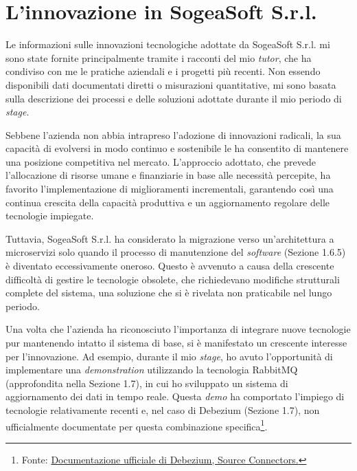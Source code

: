     
    \section{L’innovazione in SogeaSoft S.r.l.}

    Le informazioni sulle innovazioni tecnologiche adottate da SogeaSoft S.r.l. mi sono state fornite principalmente tramite i racconti del mio \textit{tutor}, che ha condiviso con me le pratiche aziendali e i progetti più recenti. Non essendo disponibili dati documentati diretti o misurazioni quantitative, mi sono basata sulla descrizione dei processi e delle soluzioni adottate durante il mio periodo di \textit{stage}.

    \vspace{0.2 em}
    \noindent Sebbene l'azienda non abbia intrapreso l'adozione di innovazioni radicali, la sua capacità di evolversi in modo continuo e sostenibile le ha consentito di mantenere una posizione competitiva nel mercato. L'approccio adottato, che prevede l'allocazione di risorse umane e finanziarie in base alle necessità percepite, ha favorito l'implementazione di miglioramenti incrementali, garantendo così una continua crescita della capacità produttiva e un aggiornamento regolare delle tecnologie impiegate.
    
    \vspace{0.2 em}
    \noindent Tuttavia, SogeaSoft S.r.l. ha considerato la migrazione verso un'architettura a microservizi solo quando il processo di manutenzione del \textit{software} (Sezione 1.6.5) è diventato eccessivamente oneroso. Questo è avvenuto a causa della crescente difficoltà di gestire le tecnologie obsolete, che richiedevano modifiche strutturali complete del sistema, una soluzione che si è rivelata non praticabile nel lungo periodo. 

    \vspace{0.2 em}
    \noindent Una volta che l'azienda ha riconosciuto l'importanza di integrare nuove tecnologie pur mantenendo intatto il sistema di base, si è manifestato un crescente interesse per l'innovazione. Ad esempio, durante il mio \textit{stage}, ho avuto l'opportunità di implementare una \textit{demonstration} utilizzando la tecnologia RabbitMQ (approfondita nella Sezione 1.7), in cui ho sviluppato un sistema di aggiornamento dei dati in tempo reale. Questa \textit{demo} ha comportato l'impiego di tecnologie relativamente recenti e, nel caso di Debezium (Sezione 1.7), non ufficialmente documentate per questa combinazione specifica\footnote{Fonte: \href{https://debezium.io/documentation/reference/3.1/connectors/index.html}{Documentazione ufficiale di Debezium, Source Connectors.}}. 

